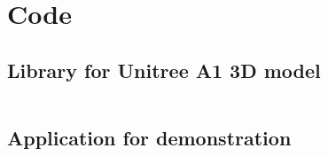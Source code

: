 \chapter{Code}

\section{Library for Unitree A1 3D model}
\inputminted[fontsize=\tiny, breaklines]{python}{../simulation/liba1.py}

\section{Application for demonstration}
\inputminted[fontsize=\tiny, breaklines]{python}{../simulation/pose_control.py}
